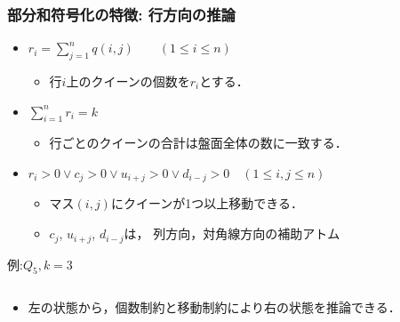 \documentclass[dvipdfmx,10pt]{beamer}
\begin{document}
\begin{frame}\frametitle{部分和符号化の特徴: 行方向の推論}
  \begin{itemize}
   \item {}\quad $r_{i}=\sum\limits_{j=1}^{n} 
	      q(i,j) \qquad (1 \leq i \leq n)$ 
	 \begin{itemize}
	  \item 行$i$上のクイーンの個数を$r_i$とする．
	 \end{itemize}
   \item {}\quad $\sum\limits_{i=1}^{n}r_{i} = k$
	 \begin{itemize}
	  \item 行ごとのクイーンの合計は盤面全体の数に一致する．
	 \end{itemize}
   \item {}\quad $r_{i}>0 \vee c_{j}>0 \vee 
	 u_{i+j}>0 \vee d_{i-j} > 0  \quad (1\leq i,j \leq n)$ 
	 \begin{itemize}
	  \item マス$(i,j)$にクイーンが1つ以上移動できる．
	  \item $c_{j}$, $u_{i+j}$, $d_{i-j}$は，
		列方向，対角線方向の補助アトム
	 \end{itemize}
  \end{itemize}
 \begin{exampleblock}{例:$Q_{5},k=3$}
  \begin{columns}
   \begin{column}{0.45\textwidth}
    \centering
    \scalebox{1}{
    
    }
   \end{column}
   \begin{column}{0.45\textwidth}
    \centering
    \scalebox{1}{
    
    }
   \end{column}
  \end{columns}
  \begin{itemize}
   \item 左の状態から，個数制約と移動制約により右の状態を推論できる．
  \end{itemize}
 \end{exampleblock}
\end{frame}
\end{document}
